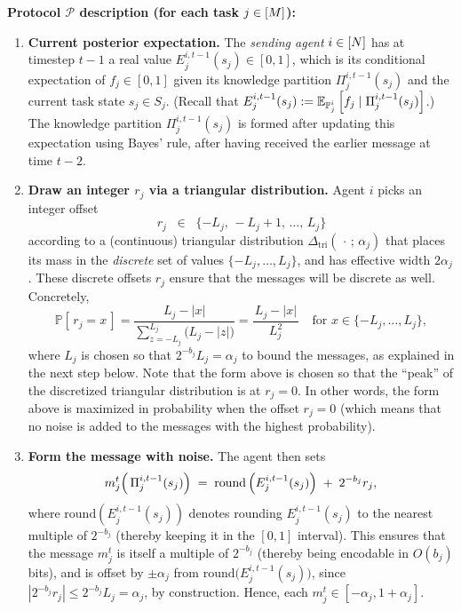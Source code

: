 \textbf{Protocol $\mathcal{P}$ description (for each task \(j\in [M]\)):}
\begin{enumerate}
\item \textbf{Current posterior expectation.}
  The \emph{sending agent} $i\in[N]$ has at timestep $t-1$ a real value $E^{i,t-1}_j(s_j) \in [0, 1]$, which is its conditional expectation of $f_j \in [0,1]$ given its knowledge partition $\Pi_j^{i,t-1}(s_j)$ and the current task state $s_j \in S_j$.
  (Recall that $E^{i,t-1}_j(s_j) := \mathbb{E}_{{\mathbb{P}}^{i}_j}\left[f_j \mid \Pi_j^{i,t-1}(s_j)\right]$.)
  The knowledge partition $\Pi_j^{i,t-1}(s_j)$ is formed after updating this expectation using Bayes' rule, after having received the earlier message at time $t-2$.

\item \textbf{Draw an integer $r_j$ via a triangular distribution.}
  Agent $i$ picks an integer offset
  \begin{equation*}
    r_j \;\;\in\;\; \{-L_j,\,-L_j+1,\,\dots,\,L_j\}
  \end{equation*}
  according to a (continuous) triangular distribution $\Delta_{\mathrm{tri}}(\,\cdot\,;\,\alpha_j)$ that places its mass in the \emph{discrete} set of values $\{-L_j,\dots,L_j\}$, and has effective width $2\alpha_j$.
  These discrete offsets $r_j$ ensure that the messages will be discrete as well.
  Concretely,
  \begin{equation*}
    \mathbb{P}[\,r_j = x\,] = \frac{L_j - |x|}
       {\displaystyle \sum_{z=-L_j}^{L_j}\bigl(L_j - |z|\bigr)} = \frac{\,L_j - |x|\,}
       {L_j^2}
  \quad
  \text{for } x \in \{-L_j,\dots,L_j\},
  \end{equation*}
  where $L_j$ is chosen so that $2^{-b_j}L_j = \alpha_j$ to bound the messages, as explained in the next step below.
  Note that the form above is chosen so that the ``peak'' of the discretized triangular distribution is at $r_j = 0$.
  In other words, the form above is maximized in probability when the offset $r_j = 0$ (which means that no noise is added to the messages with the highest probability).

\item \textbf{Form the message with noise.}
  The agent then sets
  \begin{equation*}
     m^t_j\Bigl(\,\Pi_j^{i,t-1}(s_j)\Bigr)
     \;=\;
     \mathrm{round}\left(E^{i,t-1}_j(s_j)\right)
     \;+\;
     2^{-b_j}r_j,
  \end{equation*}
  where $\mathrm{round}\left(E^{i,t-1}_j(s_j)\right)$ denotes rounding $E^{i,t-1}_j(s_j)$ to the nearest multiple of $2^{-b_j}$ (thereby keeping it in the $[0,1]$ interval).
  This ensures that the message $m_j^t$ is itself a multiple of $2^{-b_j}$ (thereby being encodable in $O(b_j)$ bits), and is offset by $\pm \alpha_j$ from $\mathrm{round}\bigl(E^{i,t-1}_j(s_j)\bigr)$, since $|2^{-b_j}r_j| \le 2^{-b_j}L_j = \alpha_j$, by construction.
  Hence, each $m^t_j \in [-\alpha_j, 1+\alpha_j]$.


\end{enumerate}
